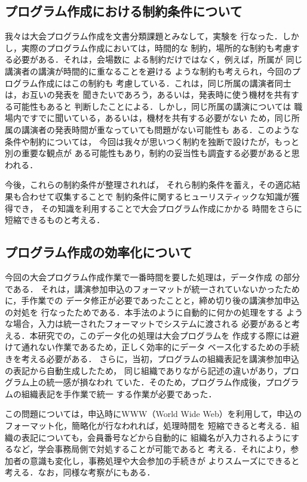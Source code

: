 \subsection{プログラム作成における制約条件について}
我々は大会プログラム作成を文書分類課題とみなして，実験を
行なった．しかし，実際のプログラム作成においては，時間的な
制約，場所的な制約も考慮する必要がある．それは，会場数に
よる制約だけではなく，例えば，所属が
同じ講演者の講演が時間的に重なることを避ける
ような制約も考えられ，今回のプログラム作成にはこの制約も
考慮している．これは，同じ所属の講演者同士は，お互いの発表を
聞きたいであろう，あるいは，発表時に使う機材を共有する可能性もあると
判断したことによる．しかし，同じ所属の講演については
職場内ですでに聞いている，あるいは，機材を共有する必要がない
ため，同じ所属の講演者の発表時間が重なっていても問題がない可能性も
ある．このような条件や制約については，
今回は我々が思いつく制約を独断で設けたが，もっと別の重要な観点が
ある可能性もあり，制約の妥当性も調査する必要があると思われる．


今後，これらの制約条件が整理されれば，
それら制約条件を蓄え，その適応結果も合わせて収集することで
制約条件に関するヒューリスティックな知識が獲得でき，
その知識を利用することで大会プログラム作成にかかる
時間をさらに短縮できるものと考える．

\subsection{プログラム作成の効率化について}
今回の大会プログラム作成作業で一番時間を要した処理は，データ作成
の部分である．
それは，講演参加申込のフォーマットが統一されていないかったために，手作業での
データ修正が必要であったことと，締め切り後の講演参加申込の対処を
行なったためである．本手法のように自動的に何かの処理をする
ような場合，入力は統一されたフォーマットでシステムに渡される
必要があると考える．本研究での，このデータ化の処理は大会プログラムを
作成する際には避けて通れない作業であるため，正しく効率的にデータ
ベース化するための手続きを考える必要がある．
さらに，当初，プログラムの組織表記を講演参加申込の表記から自動生成したため，
同じ組織でありながら記述の違いがあり，プログラム上の統一感が損なわれ
ていた．そのため，プログラム作成後，プログラムの組織表記を手作業で統一
する作業が必要であった．


この問題については，申込時にWWW（World Wide Web）を利用して，申込の
フォーマット化，簡略化が行なわれれば，処理時間を
短縮できると考える．組織の表記についても，会員番号などから自動的に
組織名が入力されるようにするなど，学会事務局側で対処することが可能であると
考える．それにより，参加者の意識も変化し，事務処理や大会参加の手続きが
よりスムーズにできると考える．なお，同様な考察が\cite{IEE}にもある．

